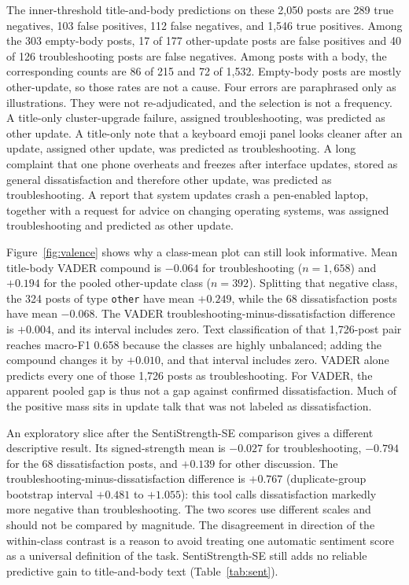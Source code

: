 \documentclass[conference,letterpaper]{IEEEtran}
\begin{document}
The inner-threshold title-and-body predictions on these 2,050 posts are 289 true negatives, 103 false positives, 112 false negatives, and 1,546 true positives. Among the 303 empty-body posts, 17 of 177 other-update posts are false positives and 40 of 126 troubleshooting posts are false negatives. Among posts with a body, the corresponding counts are 86 of 215 and 72 of 1,532. Empty-body posts are mostly other-update, so those rates are not a cause. Four errors are paraphrased only as illustrations. They were not re-adjudicated, and the selection is not a frequency. A title-only cluster-upgrade failure, assigned troubleshooting, was predicted as other update. A title-only note that a keyboard emoji panel looks cleaner after an update, assigned other update, was predicted as troubleshooting. A long complaint that one phone overheats and freezes after interface updates, stored as general dissatisfaction and therefore other update, was predicted as troubleshooting. A report that system updates crash a pen-enabled laptop, together with a request for advice on changing operating systems, was assigned troubleshooting and predicted as other update.

Figure~\ref{fig:valence} shows why a class-mean plot can still look informative. Mean title-body VADER compound is $-0.064$ for troubleshooting ($n=1{,}658$) and $+0.194$ for the pooled other-update class ($n=392$). Splitting that negative class, the 324 posts of type \texttt{other} have mean $+0.249$, while the 68 dissatisfaction posts have mean $-0.068$. The VADER troubleshooting-minus-dissatisfaction difference is $+0.004$, and its interval includes zero. Text classification of that 1,726-post pair reaches macro-F1 0.658 because the classes are highly unbalanced; adding the compound changes it by $+0.010$, and that interval includes zero. VADER alone predicts every one of those 1,726 posts as troubleshooting. For VADER, the apparent pooled gap is thus not a gap against confirmed dissatisfaction. Much of the positive mass sits in update talk that was not labeled as dissatisfaction.

An exploratory slice after the SentiStrength-SE comparison gives a different descriptive result. Its signed-strength mean is $-0.027$ for troubleshooting, $-0.794$ for the 68 dissatisfaction posts, and $+0.139$ for other discussion. The troubleshooting-minus-dissatisfaction difference is $+0.767$ (duplicate-group bootstrap interval $+0.481$ to $+1.055$): this tool calls dissatisfaction markedly more negative than troubleshooting. The two scores use different scales and should not be compared by magnitude. The disagreement in direction of the within-class contrast is a reason to avoid treating one automatic sentiment score as a universal definition of the task. SentiStrength-SE still adds no reliable predictive gain to title-and-body text (Table~\ref{tab:sent}).
\end{document}
